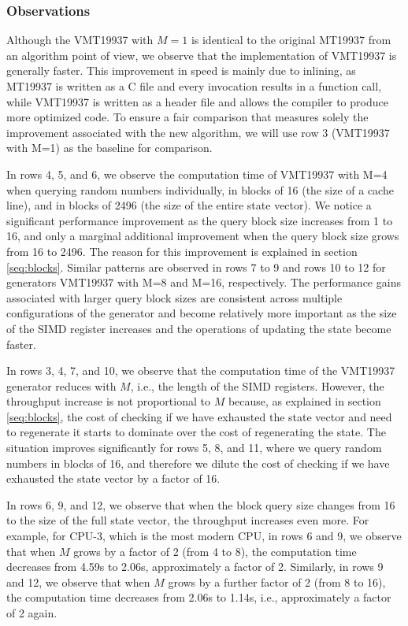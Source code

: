 \documentclass[preprint,1p,times]{elsarticle}
\begin{document}
			\subsubsection{Observations}
			Although the VMT19937 with $M=1$ is identical to the original MT19937 from an algorithm point of view, we observe that the implementation of VMT19937 is generally faster. This improvement in speed is mainly due to inlining, as MT19937 is written as a C file and every invocation results in a function call, while VMT19937 is written as a header file and allows the compiler to produce more optimized code. To ensure a fair comparison that measures solely the improvement associated with the new algorithm, we will use row 3 (VMT19937 with M=1) as the baseline for comparison.
			
			In rows 4, 5, and 6, we observe the computation time of VMT19937 with M=4 when querying random numbers individually, in blocks of 16 (the size of a cache line), and in blocks of 2496 (the size of the entire state vector). We notice a significant performance improvement as the query block size increases from 1 to 16, and only a marginal additional improvement when the query block size grows from 16 to 2496. The reason for this improvement is explained in section \ref{seq:blocks}. Similar patterns are observed in rows 7 to 9 and rows 10 to 12 for generators VMT19937 with M=8 and M=16, respectively. The performance gains associated with larger query block sizes are consistent across multiple configurations of the generator and become relatively more important as the size of the SIMD register increases and the operations of updating the state become faster.
			
			In rows 3, 4, 7, and 10, we observe that the computation time of the VMT19937 generator reduces with $M$, i.e., the length of the SIMD registers. However, the throughput increase is not proportional to $M$ because, as explained in section \ref{seq:blocks}, the cost of checking if we have exhausted the state vector and need to regenerate it starts to dominate over the cost of regenerating the state. The situation improves significantly for rows 5, 8, and 11, where we query random numbers in blocks of 16, and therefore we dilute the cost of checking if we have exhausted the state vector by a factor of 16.
			
			In rows 6, 9, and 12, we observe that when the block query size changes from 16 to the size of the full state vector, the throughput increases even more. For example, for CPU-3, which is the most modern CPU, in rows 6 and 9, we observe that when $M$ grows by a factor of 2 (from 4 to 8), the computation time decreases from 4.59s to 2.06s, approximately a factor of 2. Similarly, in rows 9 and 12, we observe that when $M$ grows by a further factor of 2 (from 8 to 16), the computation time decreases from 2.06s to 1.14s, i.e., approximately a factor of 2 again.
			
\end{document}
